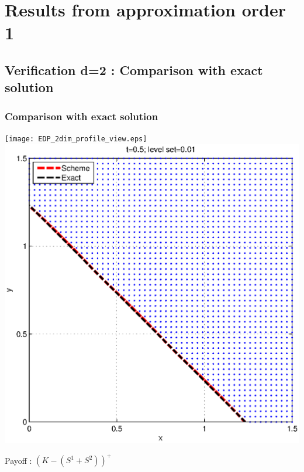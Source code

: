 \documentclass[]{beamer}
\begin{document}
\section{Results from approximation order 1}
\subsection{Verification d=2 : Comparison with exact solution}
\begin{frame}
\frametitle{Comparison with exact solution}
\texttt{[image: EDP\_2dim\_profile\_view.eps]}
\includegraphics[scale=0.3]{EDP_isoline_lvlE-2.eps}
\begin{center}
Payoff : $ (K-(S^1+S^2))^+$
\end{center}
\end{frame}
\end{document}
